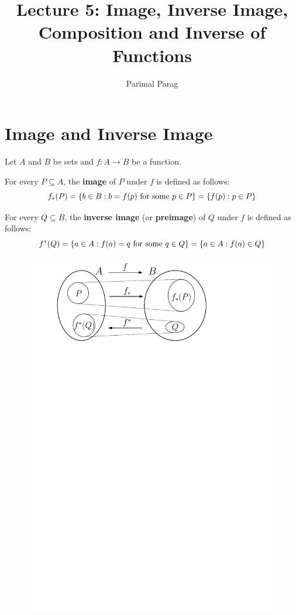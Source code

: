 \documentclass[a4paper,english,12pt]{article}
\begin{document}
\title{Lecture 5: Image, Inverse Image, Composition and Inverse of Functions}
\author{Parimal Parag}
\maketitle

\section{Image and Inverse Image}
Let $A$ and $B$ be sets and $f:A\rightarrow B$ be a function. 
\begin{defn}[Image] For every $P\subseteq A$, the \textbf{image} of $P$ under $f$ is defined as follows:
\begin{equation*}
f_*(P)  =\{b\in B: b=f(p) \textnormal{ for some } p\in P\} =\{f(p):p\in P\}
\end{equation*}
\end{defn}

\begin{defn} For every $Q\subseteq B$, the \textbf{inverse image} (or \textbf{preimage}) of $Q$ under $f$ is defined as follows:
\begin{equation*}
f^*(Q)  =\{a\in A: f(a)=q \textnormal{ for some } q\in Q\} =\{a\in A:f(a)\in Q\}
\end{equation*}
\end{defn}

\begin{figure}[h]
\centering
\includegraphics[scale=0.6]{Figures/l5f1_img-invimg.pdf}
\caption{}
\end{figure}
\end{document}
